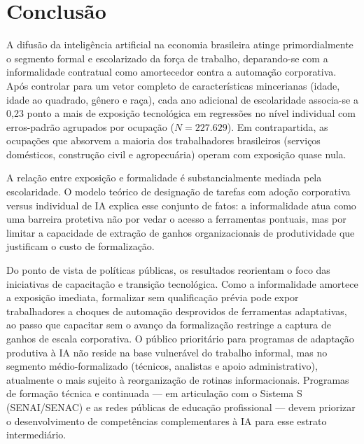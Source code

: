 \section{Conclusão}
\label{sec:conclusao}

A difusão da inteligência artificial na economia brasileira atinge primordialmente o segmento formal e escolarizado da força de trabalho, deparando-se com a informalidade contratual como amortecedor contra a automação corporativa. Após controlar para um vetor completo de características mincerianas (idade, idade ao quadrado, gênero e raça), cada ano adicional de escolaridade associa-se a 0{,}23 ponto a mais de exposição tecnológica em regressões no nível individual com erros-padrão agrupados por ocupação ($N = 227.629$). Em contrapartida, as ocupações que absorvem a maioria dos trabalhadores brasileiros (serviços domésticos, construção civil e agropecuária) operam com exposição quase nula.

A relação entre exposição e formalidade é substancialmente mediada pela escolaridade. O modelo teórico de designação de tarefas com adoção corporativa versus individual de IA explica esse conjunto de fatos: a informalidade atua como uma barreira protetiva não por vedar o acesso a ferramentas pontuais, mas por limitar a capacidade de extração de ganhos organizacionais de produtividade que justificam o custo de formalização.

Do ponto de vista de políticas públicas, os resultados reorientam o foco das iniciativas de capacitação e transição tecnológica. Como a informalidade amortece a exposição imediata, formalizar sem qualificação prévia pode expor trabalhadores a choques de automação desprovidos de ferramentas adaptativas, ao passo que capacitar sem o avanço da formalização restringe a captura de ganhos de escala corporativa. O público prioritário para programas de adaptação produtiva à IA não reside na base vulnerável do trabalho informal, mas no segmento médio-formalizado (técnicos, analistas e apoio administrativo), atualmente o mais sujeito à reorganização de rotinas informacionais. Programas de formação técnica e continuada --- em articulação com o Sistema S (SENAI/SENAC) e as redes públicas de educação profissional --- devem priorizar o desenvolvimento de competências complementares à IA para esse estrato intermediário.
